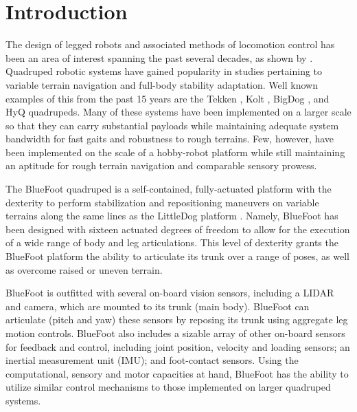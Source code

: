 \chapter{Introduction}
	\label{ch::introduction}

		The design of legged robots and associated methods of locomotion control has been an area of interest spanning the past several decades, as shown by \cite{McGhee1965,Hodgins1991,Altendorfer2001,Kolter2008,Wieber2015}. Quadruped robotic systems have gained popularity in studies pertaining to variable terrain navigation and full-body stability adaptation. Well known examples of this from the past 15 years are the Tekken \cite{Fukuoka2003}, Kolt \cite{Estremera2006}, BigDog \cite{BigDog2008}, and HyQ \cite{Semini2010_PHD} quadrupeds. Many of these systems have been implemented on a larger scale so that they can carry substantial payloads while maintaining adequate system bandwidth for fast gaits and robustness to rough terrains. Few, however, have been implemented on the scale of a hobby-robot platform while still maintaining an aptitude for rough terrain navigation and comparable sensory prowess.

		The BlueFoot quadruped is a self-contained, fully-actuated platform with the dexterity to perform stabilization and repositioning maneuvers on variable terrains along the same lines as the LittleDog platform \cite{Rebula2007}. Namely, BlueFoot has been designed with sixteen actuated degrees of freedom to allow for the execution of a wide range of body and leg articulations. This level of dexterity grants the BlueFoot platform the ability to articulate its trunk over a range of poses, as well as overcome raised or uneven terrain. 

		BlueFoot is outfitted with several on-board vision sensors, including a LIDAR and camera, which are mounted to its trunk (main body). BlueFoot can articulate (\IE pitch and yaw) these sensors by reposing its trunk using aggregate leg motion controls. BlueFoot also includes a sizable array of other on-board sensors for feedback and control, including joint position, velocity and loading sensors; an inertial measurement unit (IMU); and foot-contact sensors. Using the computational, sensory and motor capacities at hand, BlueFoot has the ability to utilize similar control mechanisms to those implemented on larger quadruped systems. 

